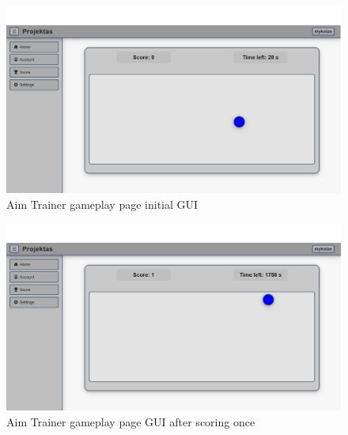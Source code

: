 \documentclass[11pt,a4paper]{article}
\begin{document}

\begin{figure}[H]
    \centering
    \includegraphics[width=1\textwidth,keepaspectratio]{PSI_3rd_trial/PNGs/aim_trainer_1.png}
    \caption{Aim Trainer gameplay page initial GUI}
    \label{fig:aim_trainer_1}
\end{figure}

\begin{figure}[H]
    \centering
    \includegraphics[width=1\textwidth,keepaspectratio]{PSI_3rd_trial/PNGs/aim_trainer_2.png}
    \caption{Aim Trainer gameplay page GUI after scoring once}
    \label{fig:aim_trainer_2}
\end{figure}
\end{document}
